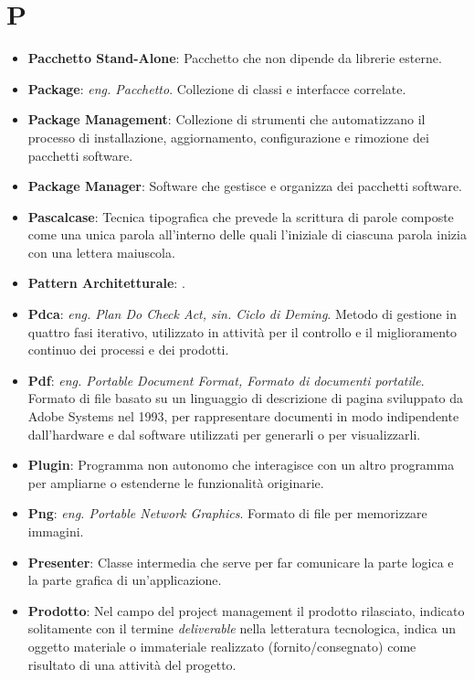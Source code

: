 \section*{P}
\begin{itemize}
	\item
	\textbf{Pacchetto Stand-Alone}: Pacchetto che non dipende da librerie esterne.
	\item
	\textbf{Package}: \textit{eng. Pacchetto}. Collezione di classi e interfacce correlate.
	\item
	\textbf{Package Management}: Collezione di strumenti che automatizzano il processo di installazione, aggiornamento, configurazione e rimozione dei pacchetti software.
	\item
	\textbf{Package Manager}: Software che gestisce e organizza dei pacchetti software.
	\item
	\textbf{Pascalcase}: Tecnica tipografica che prevede la scrittura di parole composte come una unica parola all'interno delle quali l'iniziale di ciascuna parola inizia con una lettera maiuscola.
	\item
	\textbf{Pattern Architetturale}: .
	\item
	\textbf{Pdca}: \textit{eng. Plan Do Check Act, sin. Ciclo di Deming}. Metodo di gestione in quattro fasi iterativo, utilizzato in attività per il controllo e il miglioramento continuo dei processi e dei prodotti.
	\item
	\textbf{Pdf}: \textit{eng. Portable Document Format, Formato di documenti portatile}. Formato di file basato su un linguaggio di descrizione di pagina sviluppato da Adobe Systems nel 1993, per rappresentare documenti in modo indipendente dall'hardware e dal software utilizzati per generarli o per visualizzarli.
	\item
	\textbf{Plugin}: Programma non autonomo che interagisce con un altro programma per ampliarne o estenderne le funzionalità originarie.
	\item
	\textbf{Png}: \textit{eng. Portable Network Graphics}. Formato di file per memorizzare immagini.
	\item
	\textbf{Presenter}: Classe intermedia che serve per far comunicare la parte logica e la parte grafica di un'applicazione.
	\item
	\textbf{Prodotto}: Nel campo del project management il prodotto rilasciato, indicato solitamente con il termine \textit{deliverable} nella letteratura tecnologica, indica un oggetto materiale o immateriale realizzato (fornito/consegnato) come risultato di una attività del progetto.

\end{itemize}
